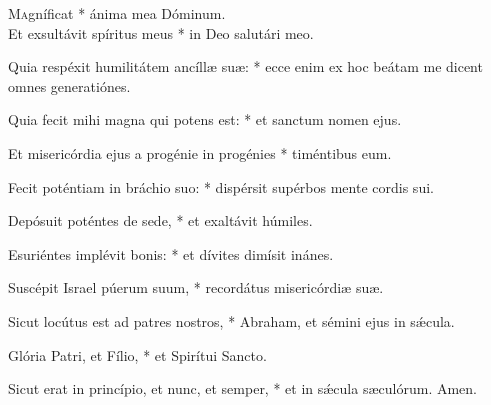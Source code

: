 

\lettrine{M}agníficat * ánima mea Dóminum.\\ Et exsultávit spíritus meus * in Deo salutári meo.

 Quia respéxit humilitátem ancíllæ suæ: * ecce enim ex hoc beátam me dicent o\-mnes generatiónes.

 Quia fecit mihi magna qui potens est: * et san\-ctum nomen ejus.

 Et misericórdia ejus a progénie in progénies * timéntibus eum.

 Fecit poténtiam in bráchio suo: * dispérsit supérbos mente cordis sui.

 Depósuit poténtes de sede, * et exaltávit húmiles.

 Esuriéntes implévit bonis: * et dívites dimísit inánes.

 Suscépit Israel púerum suum, * recordátus misericórdiæ suæ.

 Sicut locútus est ad patres no\-stros, * Abraham, et sémini ejus in sǽcula.

 Glória Patri, et Fílio, * et Spirítui San\-cto.

 Sicut erat in princípio, et nunc, et semper, * et in sǽcula sæculórum. Amen.
 
